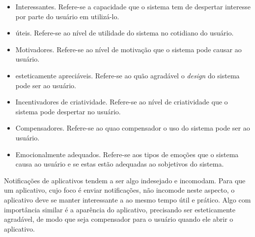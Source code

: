     \begin{itemize}
       \item Interessantes.
       \subitem Refere-se a capacidade que o sistema tem de despertar interesse por parte do usuário em utilizá-lo.
    \end{itemize}
    
    \begin{itemize}
       \item úteis.
       \subitem Refere-se ao nível de utilidade do sistema no cotidiano do usuário.
    \end{itemize}
    
    \begin{itemize}
       \item Motivadores.
       \subitem Refere-se ao nível de motivação que o sistema pode causar ao usuário.
    \end{itemize}
    
    \begin{itemize}
       \item esteticamente apreciáveis.
       \subitem Refere-se ao quão agradável o \textit{design} do sistema pode ser ao usuário.
    \end{itemize}
    
    \begin{itemize}
       \item Incentivadores de criatividade.
       \subitem Refere-se ao nível de criatividade que o sistema pode despertar no usuário.
    \end{itemize}
    
    \begin{itemize}
       \item Compensadores.
       \subitem Refere-se ao quao compensador o uso do sistema pode ser ao usuário.
    \end{itemize}
    
    \begin{itemize}
       \item Emocionalmente adequados.
       \subitem Refere-se aos tipos de emoções que o sistema causa ao usuário e se estas estão adequadas ao sobjetivos do sistema.
    \end{itemize}
    
    Notificações de aplicativos tendem a ser algo indesejado e incomodam. Para que um aplicativo, cujo foco é enviar notificações,
    não incomode neste aspecto, o aplicativo deve se manter interessante a ao mesmo tempo útil e prático. Algo com importância similar
    é a aparência do aplicativo, precisando ser esteticamente agradável, de modo que seja compensador para o usuário quando ele abrir 
    o aplicativo.
    